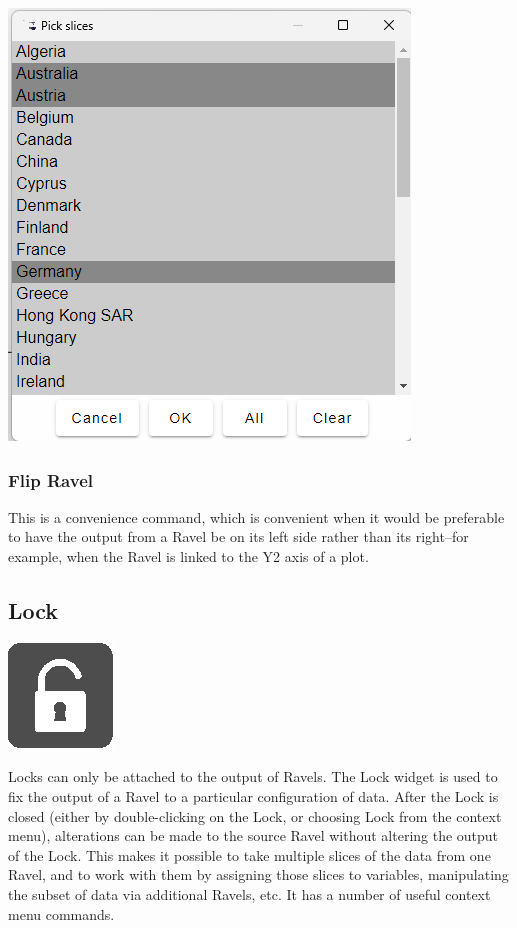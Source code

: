 \includegraphics{images/PickSlices}

\subsubsection{Flip Ravel}

This is a convenience command, which is convenient when it would be
preferable to have the output from a Ravel be on its left side rather
than its right--for example, when the Ravel is linked to the Y2 axis
of a plot.

\subsection{Lock}

\label{Lock}

\includegraphics{images/Lock}

Locks can only be attached to the output of Ravels. The Lock widget
is used to fix the output of a Ravel to a particular configuration
of data. After the Lock is closed (either by double-clicking on the
Lock, or choosing Lock from the context menu), alterations can be
made to the source Ravel without altering the output of the Lock.
This makes it possible to take multiple slices of the data from one
Ravel, and to work with them by assigning those slices to variables,
manipulating the subset of data via additional Ravels, etc. It has
a number of useful context menu commands.

